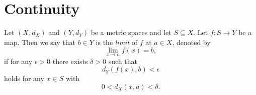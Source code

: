 \chapter{Continuity}
\begin{definition}
  Let $(X, d_X)$ and $(Y, d_Y)$ be a metric spaces and let $S \subseteq X$.
  Let $f: S \to Y$ be a map.
  Then we say that $b \in Y$ is the \emph{limit} of $f$ at $a \in X$, denoted
  by
  \begin{equation*}
    \lim_{x \to a} f(x) = b,
  \end{equation*}
  if for any $\epsilon > 0$ there exists $\delta > 0$ such that
  \begin{equation*}
    d_Y(f(x), b) < \epsilon
  \end{equation*}
  holds for any $x \in S$ with
  \begin{equation*}
    0 < d_X(x, a) < \delta.
  \end{equation*}
\end{definition}